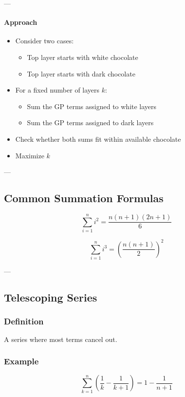 \documentclass[11pt]{article}
\begin{document}
---

\paragraph{Approach}
\begin{itemize}
    \item Consider two cases:
    \begin{itemize}
        \item Top layer starts with white chocolate
        \item Top layer starts with dark chocolate
    \end{itemize}
    \item For a fixed number of layers $k$:
    \begin{itemize}
        \item Sum the GP terms assigned to white layers
        \item Sum the GP terms assigned to dark layers
    \end{itemize}
    \item Check whether both sums fit within available chocolate
    \item Maximize $k$
\end{itemize}

---

\subsection{Common Summation Formulas}

\[
\sum_{i=1}^n i^2 = \frac{n(n+1)(2n+1)}{6}
\]

\[
\sum_{i=1}^n i^3 = \left( \frac{n(n+1)}{2} \right)^2
\]

---

\subsection{Telescoping Series}

\subsubsection{Definition}
A series where most terms cancel out.

\subsubsection{Example}
\[
\sum_{k=1}^n \left( \frac{1}{k} - \frac{1}{k+1} \right)
= 1 - \frac{1}{n+1}
\]
\end{document}
